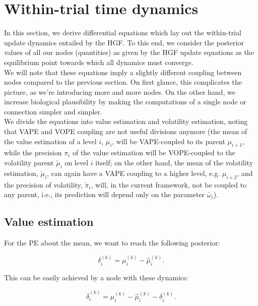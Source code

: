 \section{Within-trial time dynamics}

In this section, we derive differential equations which lay out the within-trial update dynamics entailed by the HGF. To this end, we consider the posterior values of all our nodes (quantities) as given by the HGF update equations as the equilibrium point towards which all dynamics must converge. \\

We will note that these equations imply a slightly different coupling between nodes compared to the previous section. On first glance, this complicates the picture, as we're introducing more and more nodes. On the other hand, we increase biological plausibility by making the computations of a single node or connection simpler and simpler.\\

We divide the equations into \textsf{value} estimation and \textsf{volatility} estimation, noting that \textsf{VAPE} and \textsf{VOPE} coupling are not useful divisions anymore (the mean of the value estimation of a level $i$, $\mu_i$, will be \textsf{VAPE}-coupled to its parent $\mu_{i+1}$, while the precision $\pi_i$ of the value estimation will be \textsf{VOPE}-coupled to the volatility parent $\check{\mu}_i$ on level $i$ itself; on the other hand, the mean of the volatility estimation, $\check{\mu}_i$, can again have a \textsf{VAPE} coupling to a higher level, e.g. $\mu_{i+2}$, and the precision of volatility, $\check{\pi}_i$, will, in the current framework, not be coupled to any parent, i.e., its prediction will depend only on the parameter $\check{\omega_i}$).

\subsection{Value estimation}

For the \textsf{PE} about the mean, we want to reach the following posterior:

\begin{equation}
	\delta_i^{(k)} = \mu_i^{(k)} - \hat{\mu}_i^{(k)}.
\end{equation}

This can be easily achieved by a node with these dynamics:

\begin{equation}
	\dot{\delta}_i^{(k)} = \mu_i^{(k)} - \hat{\mu}_i^{(k)} - \delta_i^{(k)}.
\end{equation}

